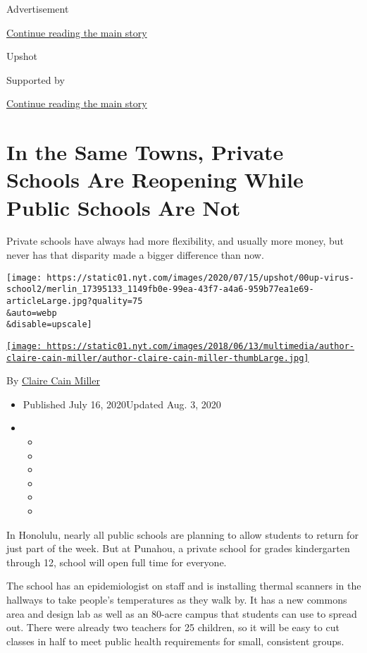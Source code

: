Advertisement

\protect\hyperlink{after-top}{Continue reading the main story}

Upshot

Supported by

\protect\hyperlink{after-sponsor}{Continue reading the main story}

\hypertarget{in-the-same-towns-private-schools-are-reopening-while-public-schools-are-not}{%
\section{In the Same Towns, Private Schools Are Reopening While Public
Schools Are
Not}\label{in-the-same-towns-private-schools-are-reopening-while-public-schools-are-not}}

Private schools have always had more flexibility, and usually more
money, but never has that disparity made a bigger difference than now.

\texttt{[image: https://static01.nyt.com/images/2020/07/15/upshot/00up-virus-school2/merlin\_17395133\_1149fb0e-99ea-43f7-a4a6-959b77ea1e69-articleLarge.jpg?quality=75\\\&auto=webp\\\&disable=upscale]}

\href{https://www.nytimes.com/by/claire-cain-miller}{\texttt{[image: https://static01.nyt.com/images/2018/06/13/multimedia/author-claire-cain-miller/author-claire-cain-miller-thumbLarge.jpg]}}

By \href{https://www.nytimes.com/by/claire-cain-miller}{Claire Cain
Miller}

\begin{itemize}
\item
  Published July 16, 2020Updated Aug. 3, 2020
\item
  \begin{itemize}
  \item
  \item
  \item
  \item
  \item
  \item
  \end{itemize}
\end{itemize}

In Honolulu, nearly all public schools are planning to allow students to
return for just part of the week. But at Punahou, a private school for
grades kindergarten through 12, school will open full time for everyone.

The school has an epidemiologist on staff and is installing thermal
scanners in the hallways to take people's temperatures as they walk by.
It has a new commons area and design lab as well as an 80-acre campus
that students can use to spread out. There were already two teachers for
25 children, so it will be easy to cut classes in half to meet public
health requirements for small, consistent groups.

